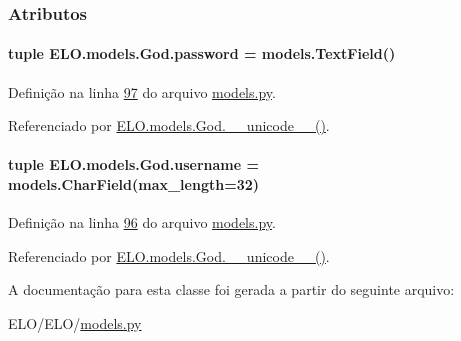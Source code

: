 \subsubsection{Atributos}
\hypertarget{classELO_1_1models_1_1God_ae566fce421f4a31517a053af2abcff31}{}
\paragraph[{password}]{\setlength{\rightskip}{0pt plus 5cm}tuple E\+L\+O.\+models.\+God.\+password = models.\+Text\+Field()\hspace{0.3cm}{\ttfamily [static]}}\label{classELO_1_1models_1_1God_ae566fce421f4a31517a053af2abcff31}


Definição na linha \hyperlink{ELO_2models_8py_source_l00097}{97} do arquivo \hyperlink{ELO_2models_8py_source}{models.\+py}.



Referenciado por \hyperlink{classELO_1_1models_1_1God_ad885cef3d586b18dd3639ebf3bfd66eb}{E\+L\+O.\+models.\+God.\+\_\+\+\_\+unicode\+\_\+\+\_\+()}.

\hypertarget{classELO_1_1models_1_1God_a8b9ebc1601b71f2b52e72c9fbd3030bc}{}
\paragraph[{username}]{\setlength{\rightskip}{0pt plus 5cm}tuple E\+L\+O.\+models.\+God.\+username = models.\+Char\+Field(max\+\_\+length=32)\hspace{0.3cm}{\ttfamily [static]}}\label{classELO_1_1models_1_1God_a8b9ebc1601b71f2b52e72c9fbd3030bc}


Definição na linha \hyperlink{ELO_2models_8py_source_l00096}{96} do arquivo \hyperlink{ELO_2models_8py_source}{models.\+py}.



Referenciado por \hyperlink{classELO_1_1models_1_1God_ad885cef3d586b18dd3639ebf3bfd66eb}{E\+L\+O.\+models.\+God.\+\_\+\+\_\+unicode\+\_\+\+\_\+()}.



A documentação para esta classe foi gerada a partir do seguinte arquivo\+:\begin{DoxyCompactItemize}
\item 
E\+L\+O/\+E\+L\+O/\hyperlink{ELO_2models_8py}{models.\+py}\end{DoxyCompactItemize}
